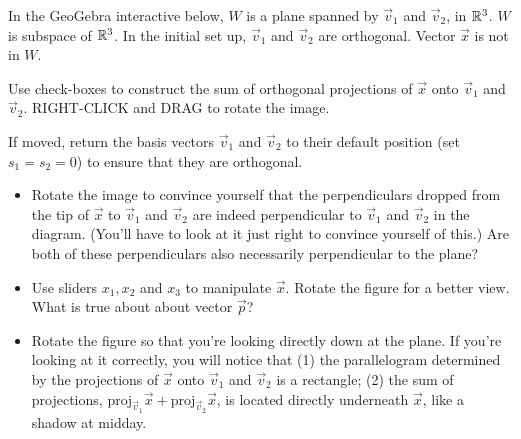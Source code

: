 \documentclass{ximera}
\begin{document}
\begin{exploration}\label{exp:orthProjSub}
In the GeoGebra interactive below, $W$ is a plane spanned by $\vec{v}_1$ and $\vec{v}_2$, in $\mathbb{R}^3$.  $W$ is subspace of $\mathbb{R}^3$.  In the initial set up, $\vec{v}_1$ and $\vec{v}_2$ are orthogonal.  Vector $\vec{x}$ is not in $W$.  

Use check-boxes to construct the sum of orthogonal projections of $\vec{x}$ onto $\vec{v}_1$ and $\vec{v}_2$.  RIGHT-CLICK and DRAG to rotate the image.   


\begin{onlineOnly}
\begin{center}
\end{center}
\end{onlineOnly}

\begin{question}
If moved, return the basis vectors $\vec{v}_1$ and $\vec{v}_2$ to their default position (set $s_1=s_2=0$) to ensure that they are orthogonal.  

\begin{itemize}
\item Rotate the image to convince yourself that the perpendiculars dropped from the tip of $\vec{x}$ to $\vec{v}_1$ and $\vec{v}_2$ are indeed perpendicular to $\vec{v}_1$ and $\vec{v}_2$ in the diagram. (You'll have to look at it just right to convince yourself of this.)  Are both of these perpendiculars also necessarily perpendicular to the plane? 

\item Use sliders $x_1, x_2$ and $x_3$ to manipulate $\vec{x}$.  Rotate the figure for a better view.  What is true about about vector $\vec{p}$?
    
    \begin{multipleChoice}
 \end{multipleChoice}
 
  \item Rotate the figure so that you're looking directly down at the plane.  If you're looking at it correctly, you will notice that (1) the parallelogram determined by the projections of $\vec{x}$ onto $\vec{v}_1$ and $\vec{v}_2$ is a rectangle; (2) the sum of projections, $\mbox{proj}_{\vec{v}_1}\vec{x}+\mbox{proj}_{\vec{v}_2}\vec{x}$, is located directly underneath $\vec{x}$, like a shadow at midday.
 \end{itemize} 
 \end{question}


\end{exploration}
\end{document}
